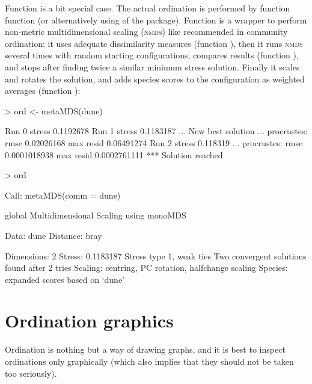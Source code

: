 \documentclass[a4paper,10pt]{article}
\begin{document}
Function  is a bit special case.  The actual ordination
is performed by function  function  (or
alternatively using  of the  package).
Function  is a wrapper to perform non-metric
multidimensional scaling (\textsc{nmds}) like recommended in community
ordination: it uses adequate dissimilarity measures (function
), then it runs \textsc{nmds} several times with random
starting configurations, compares results (function
), and stops after finding twice a similar minimum
stress solution.  Finally it scales and rotates the solution, and adds
species scores to the configuration as weighted averages (function
):
\begin{Schunk}
\begin{Sinput}
> ord <- metaMDS(dune)
\end{Sinput}
\begin{Soutput}
Run 0 stress 0.1192678 
Run 1 stress 0.1183187 
... New best solution
... procrustes: rmse 0.02026168  max resid 0.06491274 
Run 2 stress 0.118319 
... procrustes: rmse 0.0001018938  max resid 0.0002761111 
*** Solution reached
\end{Soutput}
\begin{Sinput}
> ord
\end{Sinput}
\begin{Soutput}
Call:
metaMDS(comm = dune) 

global Multidimensional Scaling using monoMDS

Data:     dune 
Distance: bray 

Dimensions: 2 
Stress:     0.1183187 
Stress type 1, weak ties
Two convergent solutions found after 2 tries
Scaling: centring, PC rotation, halfchange scaling 
Species: expanded scores based on ‘dune’ 
\end{Soutput}
\end{Schunk}

\section{Ordination graphics}

Ordination is nothing but a way of drawing graphs, and it is best to
inspect ordinations only graphically (which also implies that they
should not be taken too seriously).
\end{document}
